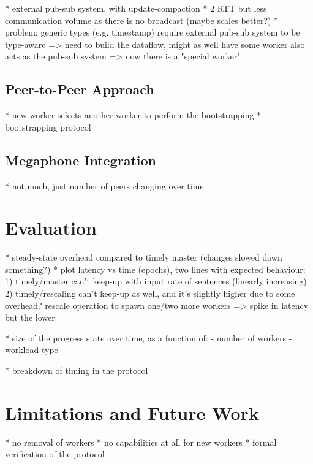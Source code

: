 \documentclass[12pt]{extarticle}
\begin{document}
* external pub-sub system, with update-compaction
* 2 RTT but less communication volume as there is no broadcast (maybe scales better?)
* problem: generic types (e.g. timestamp) require external pub-sub system to be type-aware
   => need to build the dataflow, might as well have some worker also acts as the pub-sub system
   => now there is a "special worker"

\subsection{Peer-to-Peer Approach}

* new worker selects another worker to perform the bootstrapping
* bootstrapping protocol

\subsection{Megaphone Integration}

* not much, just number of peers changing over time

\section{Evaluation}

* steady-state overhead compared to timely master (changes slowed down something?)
* plot latency vs time (epochs), two lines with expected behaviour:
    1) timely/master can't keep-up with input rate of sentences (linearly increasing)
    2) timely/rescaling can't keep-up as well, and it's slightly higher due to some overhead?
       rescale operation to spawn one/two more workers => spike in latency but the lower

* size of the progress state over time, as a function of:
  - number of workers
  - workload type

* breakdown of timing in the protocol

\section{Limitations and Future Work}

* no removal of workers
* no capabilities at all for new workers
* formal verification of the protocol
\end{document}
